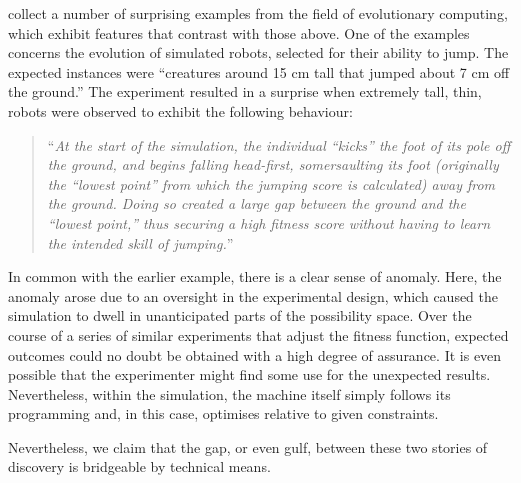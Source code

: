 \citet{alife2018cases} collect a number of surprising examples from the field of evolutionary computing, which exhibit features that contrast with those above.  One of the examples concerns the evolution of simulated robots, selected for their ability to jump.  The expected instances were ``creatures around 15 cm tall that jumped about 7 cm off the ground.''  The experiment resulted in a surprise when extremely tall, thin, robots were observed to exhibit the following behaviour:
\begin{quote}
``\emph{At the start of the simulation, the individual “kicks” the foot of its pole off the ground, and begins falling head-first, somersaulting its foot (originally the “lowest point” from which the jumping score is calculated) away from the ground. Doing so created a large gap between the ground and the “lowest point,” thus securing a high fitness score without having to learn the intended skill of jumping.}''
\end{quote}

In common with the earlier example, there is a clear sense of anomaly.  Here, the anomaly arose due to an oversight in the experimental design, which caused the simulation to dwell in unanticipated parts of the possibility space. Over the course of a series of similar experiments that adjust the fitness function, expected outcomes could no doubt be obtained with a high degree of assurance. It is even possible that the experimenter might find some use for the unexpected results. Nevertheless, within the simulation, the machine itself simply follows its programming and, in this case, optimises relative to given constraints.

Nevertheless, we claim that the gap, or even gulf, between these two stories of discovery is bridgeable by technical means. 


